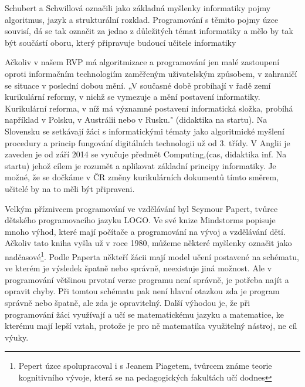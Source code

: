 \documentclass[FP,DP]{tulthesis}
\begin{document}
{{{{{{{Schubert a Schwillová označili jako základná myšlenky informatiky pojmy algoritmus, jazyk a strukturální rozklad. Programování s těmito pojmy úzce souvisí, dá se tak označit za jedno z důležitých témat informatiky a mělo by tak být součástí oboru, který připravuje budoucí učitele informatiky

Ačkoliv v našem RVP má algoritmizace a programování jen malé zastoupení oproti informačním technologiím zaměřeným uživatelským způsobem, v zahraničí se situace v poslední  dobou mění. „V současné době probíhají v řadě zemí kurikulární reformy, v nichž se vymezuje a mění postavení informatiky. Kurikulární reforma, v níž má významné postavení informatická složka, probíhá například v Polsku, v Austrálii nebo v Rusku." (didaktika na startu). Na Slovensku se setkávají žáci s informatickými tématy jako algoritmické myšlení procedury a princip fungování digitálních technologii  už od 3. třídy. V Anglii je zaveden je od září  2014 se vyučuje  předmět Computing,(cas, didaktika inf. Na startu) jehož cílem je rozumět a aplikovat  základní principy informatiky.  Je možné, že se dočkáme v ČR změny kurikulárních dokumentů tímto směrem, učitelé by na to měli být připraveni.

 Velkým příznivcem programování ve vzdělávání byl Seymour Papert, tvůrce dětského programovacího jazyku LOGO. Ve své knize Mindstorms popisuje mnoho výhod, které mají  počítače a programování na vývoj a vzdělávání dětí. Ačkoliv tato kniha vyšla už v roce 1980, můžeme některé myšlenky označit jako nadčasové\footnote{Pepert úzce spolupracoval i s Jeanem Piagetem, tvůrcem známe teorie kognitivního vývoje, která se na pedagogických fakultách učí dodnes}. Podle Paperta někteří žácii mají model učení postavené na schématu, ve kterém je výsledek špatně nebo správně, neexistuje jiná možnost. Ale v programování většinou prvotní verze programu není správně, je potřeba najít a opravit chyby. Při tomtou schématu  pak není hlavní otazkou zda je program správně nebo špatně, ale zda je opravitelný. Další výhodou je, že při programování žáci využívají a učí se matematickému jazyku a matematice, ke kterému mají lepší vztah, protože je pro ně matematika využitelný nástroj, ne cíl výuky.



}}}}}}}
\end{document}
